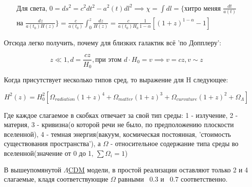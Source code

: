\begin{multline}
\text{Для света, } 0 = ds^2 = c^2dt^2 - a^2(t)dl^2 \implies \chi = \int dl = \bigg\{ \text{хитро меняя $\frac{dt}{a(t)}$} \\ \text{на $\frac{dz}{a(t_0) H(z)}$} \bigg\} = \frac{c}{a(t_0)} \int_{0}^{z} \frac{dz}{H(z)} = \frac{c}{a(t_0)H_0} \frac{1}{1-\alpha}[(1+z)^{1-\alpha} - 1]
\label{eq:18_distances}
\end{multline}

Отсюда легко получить, почему для близких галактик всё 'по Допплеру':

\begin{equation}
z \ll 1, d = \frac{c z}{H_0}, \text{при этом } d \cdot H_0 = v \implies v = c z, v \sim z
\label{eq:18_semidoppler}
\end{equation}

Когда присутствует несколько типов сред, то выражение для H следующее:

\begin{equation}
H^2(z) = H_0^2[\Omega_{radiation}(1+z)^{4} + \Omega_{matter}(1+z)^{3} + \Omega_{curvature}(1+z)^{2} + \Omega_{\Lambda}]
\label{eq:18_hubble_const}
\end{equation}

Где каждое слагаемое в скобках отвечает за свой тип среды: 1 - излучение, 2 - материя, 3 - кривизна(о которой речи не было, по предположению плоскости вселенной), 4 - темная энергия(вакуум, космическая постоянная, 'стоимость существования пространства'), а $\Omega$ - относительное содержание типа среды во вселенной(значение от 0 до 1, $\sum \Omega_i = 1$)

В вышеупомянутой \href{https://en.wikipedia.org/wiki/Lambda-CDM_model}{$\Lambda$CDM} модели, в простой реализации оставляют только 2 и 4 слагаемые, кладя соответствующие $\Omega$ равными ~0.3 и ~0.7 соответственно.

